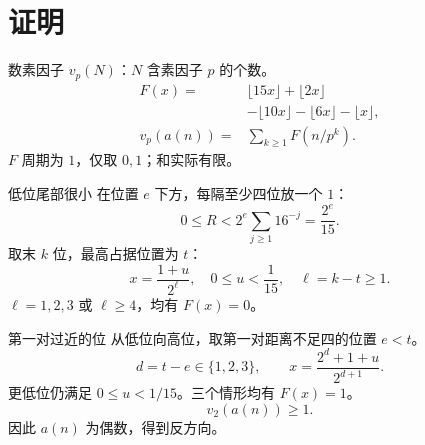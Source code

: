 \documentclass{beamer}
\begin{document}
\section{证明}
\begin{frame}{数素因子}
$v_p(N)$：$N$ 含素因子 $p$ 的个数。
\[
\begin{aligned}
F(x)={}&\lfloor15x\rfloor+\lfloor2x\rfloor\\
 &-\lfloor10x\rfloor-\lfloor6x\rfloor-\lfloor x\rfloor,\\
v_p(a(n))={}&\sum_{k\geq1}F(n/p^k).
\end{aligned}
\]
$F$ 周期为 $1$，仅取 $0,1$；和实际有限。
\end{frame}
\begin{frame}{低位尾部很小}
在位置 $e$ 下方，每隔至少四位放一个 $1$：
\[
0\leq R<2^e\sum_{j\geq1}16^{-j}=\frac{2^e}{15}.
\]
取末 $k$ 位，最高占据位置为 $t$：
\[
x=\frac{1+u}{2^\ell},\quad 0\leq u<\frac1{15},\quad\ell=k-t\geq1.
\]
$\ell=1,2,3$ 或 $\ell\geq4$，均有 $F(x)=0$。
\end{frame}
\begin{frame}{第一对过近的位}
从低位向高位，取第一对距离不足四的位置 $e<t$。
\[
d=t-e\in\{1,2,3\},\qquad
x=\frac{2^d+1+u}{2^{d+1}}.
\]
更低位仍满足 $0\leq u<1/15$。三个情形均有 $F(x)=1$。
\[
v_2(a(n))\geq1.
\]
因此 $a(n)$ 为偶数，得到反方向。
\end{frame}
\end{document}
